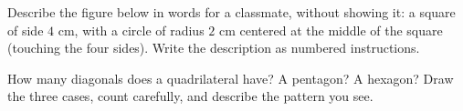 \begin{exercise}[$\star\star$]\label{exo:g4:geometry:10}
Describe the figure below in words for a classmate, without showing
it: a square of side $4$ cm, with a circle of radius $2$ cm centered
at the middle of the square (touching the four sides). Write the
description as numbered instructions.
\end{exercise}

\begin{exercise}[$\star\star$]\label{exo:g4:geometry:11}
How many diagonals does a quadrilateral have? A pentagon? A hexagon?
Draw the three cases, count carefully, and describe the pattern you
see.
\end{exercise}
